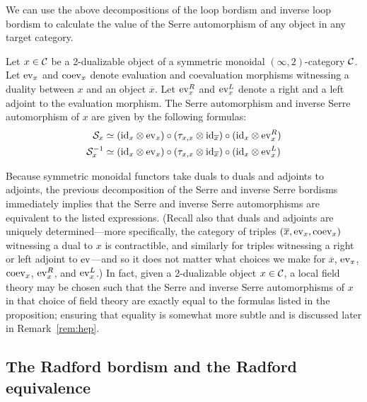 \documentclass{amsart}
\begin{document}
We can use the above decompositions of the loop bordism and inverse loop bordism to calculate the value of the Serre automorphism of any object in any target category.
\begin{proposition} \label{prop:serrecalc}
Let $x \in \mathcal C$ be a 2-dualizable object of a symmetric monoidal $(\infty,2)$-category $\mathcal C$.  Let $\mathrm{ev}_x$ and $\mathrm{coev}_x$ denote evaluation and coevaluation morphisms witnessing a duality between $x$ and an object $\overline{x}$.  Let $\mathrm{ev}_x^R$ and $\mathrm{ev}_x^L$ denote a right and a left adjoint to the evaluation morphism.  The Serre automorphism and inverse Serre automorphism of $x$ are given by the following formulas:
	\begin{align*}
		\mathcal S_x &\simeq (\mathrm{id}_{x} \otimes \mathrm{ev}_{x}) \circ (\tau_{x, x} \otimes \mathrm{id}_{\overline{x}}) \circ (\mathrm{id}_{x} \otimes \mathrm{ev}_{x}^R) \\
		\mathcal S_x^{-1} &\simeq (\mathrm{id}_{x} \otimes \mathrm{ev}_{x}) \circ (\tau_{x, x} \otimes \mathrm{id}_{\overline{x}}) \circ (\mathrm{id}_{x} \otimes \mathrm{ev}_{x}^L)
	\end{align*}
\end{proposition}
\nid Because symmetric monoidal functors take duals to duals and adjoints to adjoints, the previous decomposition of the Serre and inverse Serre bordisms immediately implies that the Serre and inverse Serre automorphisms are equivalent to the listed expressions.  (Recall also that duals and adjoints are uniquely determined---more specifically, the category of triples $(\overline{x},\mathrm{ev}_x,\mathrm{coev}_x)$ witnessing a dual to $x$ is contractible, and similarly for triples witnessing a right or left adjoint to $\mathrm{ev}$---and so it does not matter what choices we make for $\overline{x}$, $\mathrm{ev}_x$, $\mathrm{coev}_x$, $\mathrm{ev}_x^R$, and $\mathrm{ev}_x^L$.)  In fact, given a 2-dualizable object $x \in \mathcal C$, a local field theory may be chosen such that the Serre and inverse Serre automorphisms of $x$ in that choice of field theory are exactly equal to the formulas listed in the proposition; ensuring that equality is somewhat more subtle and is discussed later in Remark~\ref{rem:hep}.


\subsection{The Radford bordism and the Radford equivalence} \label{sec:Radford}
\end{document}
